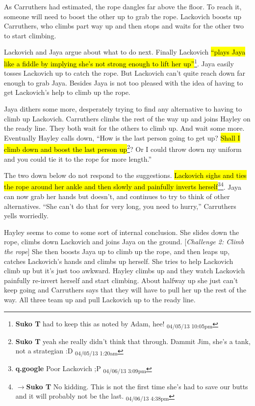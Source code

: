 As Carruthers had estimated, the rope dangles far above the floor.  To reach it, someone will need to boost the other up to grab the rope.  Lackovich boosts up Carruthers, who climbs part way up and then stops and waits for the other two to start climbing.



Lackovich and Jaya argue about what to do next.  Finally Lackovich \hl{``plays Jaya like a fiddle by implying she's not strong enough to lift her up''}\footnote{\textbf{Suko T }had to keep this as noted by Adam, hee! \textsubscript{04/05/13 10:05pm}}.  Jaya easily tosses Lackovich up to catch the rope.  But Lackovich can't quite reach down far enough to grab Jaya.  Besides Jaya is not too pleased with the idea of having to get Lackovich's help to climb up the rope.  



Jaya dithers some more, desperately trying to find any alternative to having to climb up Lackovich.  Carruthers climbs the rest of the way up and joins Hayley on the ready line.  They both wait for the others to climb up.  And wait some more.  Eventually Hayley calls down, ``How is the last person going to get up?  \hl{Shall I climb down and boost the last person up}\footnote{\textbf{Suko T }yeah she really didn't think that through.  Dammit Jim, she's a tank, not a strategian :D \textsubscript{04/05/13 1:20am}}?  Or I could throw down my uniform and you could tie it to the rope for more length.''



The two down below do not respond to the suggestions.  \hl{Lackovich sighs and ties the rope around her ankle and then slowly and painfully inverts herself}\footnote{\textbf{q.google }Poor Lackovich ;P \textsubscript{04/06/13 3:09pm}}\footnote{$\rightarrow$\textbf{Suko T }No kidding.  This is not the first time she's had to save our butts and it will probably not be the last. \textsubscript{04/06/13 4:38pm}}.  Jaya can now grab her hands but doesn't, and continues to try to think of other alternatives.  ``She can't do that for very long, you need to hurry,'' Carruthers yells worriedly.  



Hayley seems to come to some sort of internal conclusion.  She slides down the rope, climbs down Lackovich and joins Jaya on the ground.  {[}\textit{Challenge 2: Climb the rope}{]} She then boosts Jaya up to climb up the rope, and then leaps up, catches Lackovich's hands and climbs up herself.  She tries to help Lackovich climb up but it's just too awkward.  Hayley climbs up and they watch Lackovich painfully re-invert herself and start climbing.  About halfway up she just can't keep going and Carruthers says that they will have to pull her up the rest of the way.  All three team up and pull Lackovich up to the ready line.


